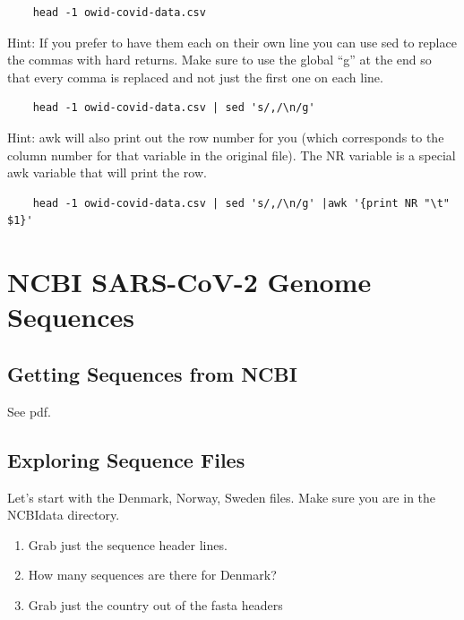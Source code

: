\documentclass[
]{book}
\begin{document}
\begin{verbatim}
    head -1 owid-covid-data.csv
\end{verbatim}

Hint: If you prefer to have them each on their own line you can use sed to replace the commas with hard returns. Make sure to use the global ``g'' at the end so that every comma is replaced and not just the first one on each line.

\begin{verbatim}
    head -1 owid-covid-data.csv | sed 's/,/\n/g'
\end{verbatim}

Hint: awk will also print out the row number for you (which corresponds to the column number for that variable in the original file). The NR variable is a special awk variable that will print the row.

\begin{verbatim}
    head -1 owid-covid-data.csv | sed 's/,/\n/g' |awk '{print NR "\t" $1}'
\end{verbatim}

\hypertarget{ncbi-sars-cov-2-genome-sequences}{%
\chapter{NCBI SARS-CoV-2 Genome Sequences}\label{ncbi-sars-cov-2-genome-sequences}}

\hypertarget{getting-sequences-from-ncbi}{%
\section{Getting Sequences from NCBI}\label{getting-sequences-from-ncbi}}

See pdf.

\hypertarget{exploring-sequence-files}{%
\section{Exploring Sequence Files}\label{exploring-sequence-files}}

Let's start with the Denmark, Norway, Sweden files. Make sure you are in the NCBIdata directory.

\begin{enumerate}
\def\labelenumi{\arabic{enumi}.}
\item
  Grab just the sequence header lines.
\item
  How many sequences are there for Denmark?
\item
  Grab just the country out of the fasta headers
\end{enumerate}
\end{document}
